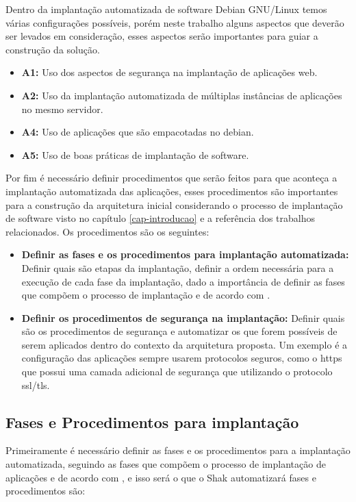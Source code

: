 Dentro da implantação automatizada de software Debian GNU/Linux temos várias
configurações possíveis, porém neste trabalho alguns aspectos que deverão ser levados em
consideração, esses aspectos serão importantes para guiar a construção da solução.

\begin{itemize}
  \item  \textbf{A1:} Uso dos aspectos de segurança na implantação de aplicações web.
  \item  \textbf{A2:} Uso da implantação automatizada de múltiplas instâncias de
   aplicações no mesmo servidor.
  \item  \textbf{A4:} Uso de aplicações que são empacotadas no debian.
  \item  \textbf{A5:} Uso de boas práticas de implantação de software.
\end{itemize}

Por fim é necessário definir procedimentos que serão
feitos para que aconteça a implantação automatizada das aplicações, esses procedimentos são
importantes para a construção da arquitetura inicial considerando
o processo de implantação de software visto no capítulo \ref{cap-introducao}
e a referência dos trabalhos relacionados. Os procedimentos são os seguintes:

\begin{itemize}
  \item  \textbf{Definir as fases e os procedimentos para implantação automatizada:}
   Definir quais são etapas da implantação, definir a ordem necessária para a execução de
  cada fase da implantação, dado a importância de definir as fases que compõem o processo de
  implantação e de acordo com \cite{omg2006}.
  \item  \textbf{Definir os procedimentos de segurança na implantação:} Definir
  quais são os procedimentos de segurança e automatizar os que forem possíveis
  de serem aplicados dentro do contexto da arquitetura proposta. Um exemplo
  é a configuração das aplicações sempre usarem protocolos seguros, como o https
  que possui uma camada adicional de segurança que utilizando o protocolo ssl/tls.
\end{itemize}

\subsection{Fases e Procedimentos para implantação}

Primeiramente é necessário definir as fases e os procedimentos para a implantação automatizada,
seguindo as fases que compõem o processo de implantação de aplicações e de acordo
com \cite{omg2006}, e isso será o que o Shak automatizará fases e procedimentos são:

